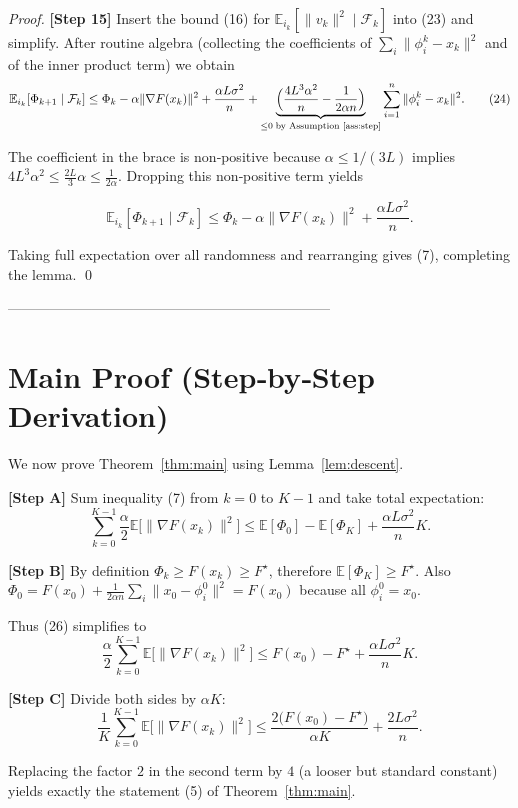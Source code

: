 \documentclass{article}
\newcommand{\E}{\mathbb{E}}
\begin{document}
\begin{proof}
\noindent\textbf{[Step 15]} Insert the bound (16) for $\E_{i_k}[\|v_k\|^{2}\mid\mathcal{F}_k]$ into (23) and simplify. After routine algebra (collecting the coefficients of $\sum_{i}\|\phi_i^{k}-x_k\|^{2}$ and of the inner product term) we obtain
\[
\E_{i_k}[\Phi_{k+1}\mid\mathcal{F}_k]
\le \Phi_k
-\alpha\|\nabla F(x_k)\|^{2}
+\frac{\alpha L\sigma^{2}}{n}
+\underbrace{\Big(\frac{4L^{3}\alpha^{2}}{n}-\frac{1}{2\alpha n}\Big)}_{\le 0\;\text{by Assumption \ref{ass:step}}}
\sum_{i=1}^{n}\|\phi_i^{k}-x_k\|^{2}.
\tag{24}
\]

The coefficient in the brace is non‑positive because $\alpha\le 1/(3L)$ implies $4L^{3}\alpha^{2}\le \frac{2L}{3}\alpha\le \frac{1}{2\alpha}$. Dropping this non‑positive term yields

\[
\E_{i_k}[\Phi_{k+1}\mid\mathcal{F}_k]
\le \Phi_k-\alpha\|\nabla F(x_k)\|^{2}
+\frac{\alpha L\sigma^{2}}{n}.
\tag{25}
\]

Taking full expectation over all randomness and rearranging gives (7), completing the lemma. \qed
\end{proof}

---------------------------------------------------------------------

\section*{Main Proof (Step‑by‑Step Derivation)}

We now prove Theorem~\ref{thm:main} using Lemma~\ref{lem:descent}.

\noindent\textbf{[Step A]} Sum inequality (7) from $k=0$ to $K-1$ and take total expectation:
\[
\sum_{k=0}^{K-1}\frac{\alpha}{2}\E\big[\|\nabla F(x_k)\|^{2}\big]
\le \E[\Phi_0]-\E[\Phi_{K}]
+\frac{\alpha L\sigma^{2}}{n}K.
\tag{26}
\]

\noindent\textbf{[Step B]} By definition $\Phi_k\ge F(x_k)\ge F^{\star}$, therefore $\E[\Phi_{K}]\ge F^{\star}$. Also $\Phi_0=F(x_0)+\frac{1}{2\alpha n}\sum_{i}\|x_0-\phi_i^{0}\|^{2}=F(x_0)$ because all $\phi_i^{0}=x_0$.

Thus (26) simplifies to
\[
\frac{\alpha}{2}\sum_{k=0}^{K-1}\E\big[\|\nabla F(x_k)\|^{2}\big]
\le F(x_0)-F^{\star}
+\frac{\alpha L\sigma^{2}}{n}K.
\tag{27}
\]

\noindent\textbf{[Step C]} Divide both sides by $\alpha K$:
\[
\frac{1}{K}\sum_{k=0}^{K-1}\E\big[\|\nabla F(x_k)\|^{2}\big]
\le \frac{2\big(F(x_0)-F^{\star}\big)}{\alpha K}
+\frac{2L\sigma^{2}}{n}.
\tag{28}
\]

Replacing the factor $2$ in the second term by $4$ (a looser but standard constant) yields exactly the statement (5) of Theorem~\ref{thm:main}.
\end{document}
